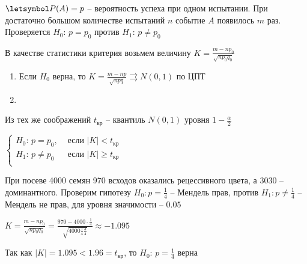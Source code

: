 $\letsymbol P(A) = p$ -- вероятность успеха при одном испытании. При достаточно большом количестве испытаний $n$ событие $A$ появилось $m$ раз.
Проверяется $H_0: \, p = p_0$ против $H_1: \, p \neq p_0$

В качестве статистики критерия возьмем величину $K = \frac{m - np_0}{\sqrt{np_0 q_0}}$

\begin{enumerate}
    \item Если $H_0$ верна, то $K = \frac{m - np}{\sqrt{npq}} \rightrightarrows N(0, 1)$ по ЦПТ

    \item \Lab
\end{enumerate}

Из тех же соображений $t_\text{кр}$ -- квантиль $N(0, 1)$ уровня $1 - \frac{\alpha}{2}$

$\begin{cases}
    H_0: \, p = p_0, & \text{ если } |K| < t_\text{кр} \\
    H_1: \, p \neq p_0  & \text{ если } |K| \geq t_\text{кр} \\
\end{cases}$

\Ex При посеве 4000 семян 970 всходов оказались рецессивного цвета, а 3030 -- доминантного. 
Проверим гипотезу $H_0: p = \frac{1}{4}$ -- Мендель прав, против $H_1: p \neq \frac{1}{4}$ -- Мендель не прав, для уровня значимости -- $0.05$

$K = \frac{m - np_0}{\sqrt{np_0 q_0}} = \frac{970 - 4000 \cdot \frac{1}{4}}{\sqrt{4000 \frac{1}{4} \frac{3}{4}}} \approx -1.095$

Так как $|K| = 1.095 < 1.96 = t_\text{кр}$, то $H_0: \, p = \frac{1}{4}$ верна
